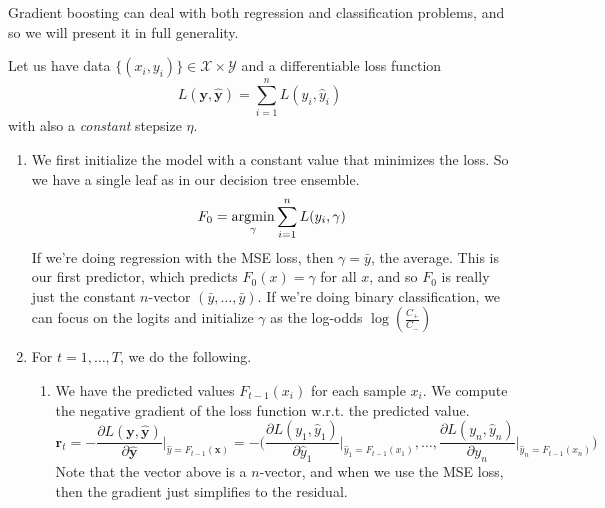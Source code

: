         Gradient boosting can deal with both regression and classification problems, and so we will present it in full generality. 

        \begin{definition}
          Let us have data $\{(x_i, y_i)\} \in \mathcal{X} \times \mathcal{Y}$ and a differentiable loss function 
          \begin{equation}
            L(\mathbf{y}, \hat{\mathbf{y}}) = \sum_{i=1}^n L(y_i, \hat{y}_i)
          \end{equation}
          with also a \textit{constant} stepsize $\eta$. 

          \begin{enumerate}
            \item We first initialize the model with a constant value that minimizes the loss. So we have a single leaf as in our decision tree ensemble. 
              \begin{equation}
                F_0 = \argmin_\gamma \sum_{i=1}^n L(y_i, \gamma)
              \end{equation}
              If we're doing regression with the MSE loss, then $\gamma = \bar{y}$, the average. This is our first predictor, which predicts $F_0 (x) = \gamma$ for all $x$, and so $F_0$ is really just the constant $n$-vector $(\bar{y}, \ldots, \bar{y})$. If we're doing binary classification, we can focus on the logits and initialize $\gamma$ as the log-odds $\log(\frac{C_+}{C_{-}})$

            \item For $t = 1, \ldots, T$, we do the following. 
              \begin{enumerate}
                \item We have the predicted values $F_{t-1}(x_i)$ for each sample $x_i$. We compute the negative gradient of the loss function w.r.t. the predicted value.
                  \begin{equation}
                    \mathbf{r}_t = - \frac{\partial L(\mathbf{y}, \hat{\mathbf{y}})}{\partial \hat{\mathbf{y}}} \bigg|_{\hat{y} = F_{t-1} (\mathbf{x})} = - \bigg( \frac{\partial L(y_1, \hat{y}_1)}{\partial \hat{y}_1} \bigg|_{\hat{y}_1 = F_{t-1} (x_1)}, \ldots, \frac{\partial L(y_n, \hat{y}_n)}{\partial y_n} \bigg|_{\hat{y}_n = F_{t-1}(x_n)} \bigg)
                  \end{equation}
                  Note that the vector above is a $n$-vector, and when we use the MSE loss, then the gradient just simplifies to the residual.  


\end{enumerate}
\end{enumerate}
\end{definition}
